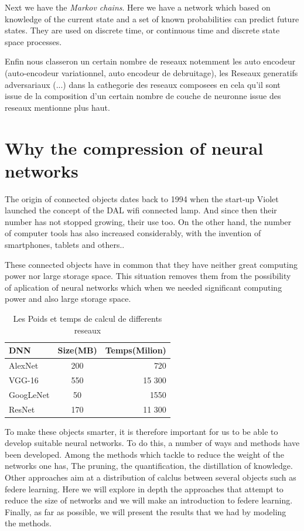 \documentclass[twoside,twocolumn]{article}
\begin{document}
Next we have the \emph{Markov chains}. Here we have a network which based on knowledge of the current state and a set of known probabilities can predict future states. 
They are used on discrete time, or continuous time and discrete state space processes.

Enfin nous classeron un certain nombre de reseaux notemment les auto encodeur (auto-encodeur variationnel, auto encodeur de debruitage), les Reseaux generatifs adversariaux (...) dans la cathegorie des reseaux composees
en cela qu'il sont issue de la composition d'un certain nombre de couche de neuronne issue des reseaux mentionne plus haut.

\section{Why the compression of neural networks}%
The origin of connected objects dates back to 1994 when the start-up Violet launched the concept of the DAL wifi connected lamp. And since then their number has 
not stopped growing, their use too. On the other hand, the number of computer tools has also increased considerably, with the invention of smartphones, tablets and others..

These connected objects have in common that they have neither great computing power nor large storage space. This situation removes them from the possibility of 
aplication of neural networks which when we needed significant computing power and also large storage space.

\begin{table}[!h]  
\begin{tabular}{|l|c|r|}
    \hline
    DNN & Size(MB) & Temps(Milion) \\
    \hline
    AlexNet & 200 & 720 \\
    VGG-16 & 550 & 15 300 \\
    GoogLeNet & 50 & 1550 \\
  ResNet & 170 & 11 300 \\
  \hline
\end{tabular}
\caption{Les Poids et temps de calcul de differents reseaux}
\end{table}

To make these objects smarter, it is therefore important for us to be able to develop suitable neural networks. To do this, a number of ways and methods have been 
developed. Among the methods which tackle to reduce the weight of the networks one has, The pruning, the quantification, the distillation of knowledge. Other approaches 
aim at a distribution of calclus between several objects such as federe learning. Here we will explore in depth the approaches that attempt to reduce the size of networks 
and we will make an introduction to federe learning. Finally, as far as possible, we will present the results that we had by modeling the methods.
\end{document}
